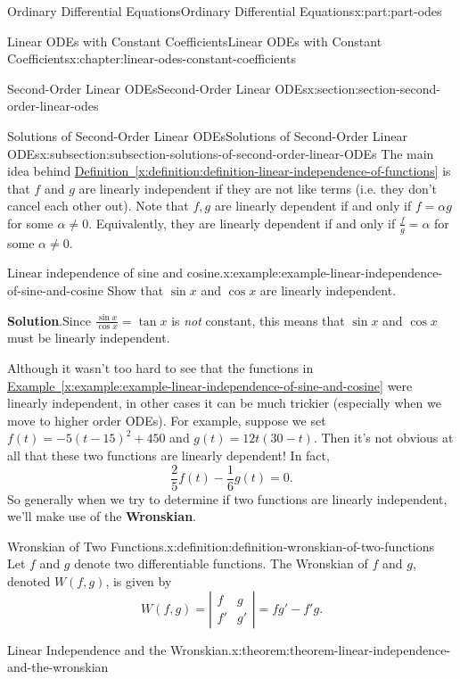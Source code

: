 \documentclass[twoside,10pt,]{book}
\newcommand{\blocktitlefont}{\relax}
\newcommand{\xreffont}{\relax}
\newcommand{\terminology}[1]{\textbf{#1}}
\numberwithin{equation}{part}
\newcommand{\amp}{&}
\begin{document}
\begin{partptx}{Ordinary Differential Equations}{}{Ordinary Differential Equations}{}{}{x:part:part-odes}
\begin{chapterptx}{Linear ODEs with Constant Coefficients}{}{Linear ODEs with Constant Coefficients}{}{}{x:chapter:linear-odes-constant-coefficients}
\begin{sectionptx}{Second-Order Linear ODEs}{}{Second-Order Linear ODEs}{}{}{x:section:section-second-order-linear-odes}
\begin{subsectionptx}{Solutions of Second-Order Linear ODEs}{}{Solutions of Second-Order Linear ODEs}{}{}{x:subsection:subsection-solutions-of-second-order-linear-ODEs}
The main idea behind \hyperref[x:definition:definition-linear-independence-of-functions]{Definition~{\xreffont\ref{x:definition:definition-linear-independence-of-functions}}} is that \(f\) and \(g\) are linearly independent if they are not like terms (i.e. they don't cancel each other out). Note that \(f,g\) are linearly dependent if and only if \(f = \alpha g\) for some \(\alpha\neq 0\). Equivalently, they are linearly dependent if and only if \(\frac{f}{g} = \alpha\) for some \(\alpha\neq0\).%
\begin{example}{Linear independence of sine and cosine.}{x:example:example-linear-independence-of-sine-and-cosine}%
Show that \(\sin x\) and \(\cos x\) are linearly independent.%
\par\smallskip%
\noindent\textbf{\blocktitlefont Solution}.\hypertarget{g:solution:idp105548815577376}{}\quad{}Since \(\frac{\sin x}{\cos x} = \tan x\) is \emph{not} constant, this means that \(\sin x\) and \(\cos x\) must be linearly independent.%
\end{example}
Although it wasn't too hard to see that the functions in \hyperref[x:example:example-linear-independence-of-sine-and-cosine]{Example~{\xreffont\ref{x:example:example-linear-independence-of-sine-and-cosine}}} were linearly independent, in other cases it can be much trickier (especially when we move to higher order ODEs). For example, suppose we set \(f(t) = -5(t-15)^{2} + 450\) and \(g(t) = 12t(30-t)\). Then it's not obvious at all that these two functions are linearly dependent! In fact,%
\begin{equation*}
\frac{2}{5}f(t) - \frac{1}{6}g(t) = 0.
\end{equation*}
So generally when we try to determine if two functions are linearly independent, we'll make use of the \terminology{Wronskian}.%
\begin{definition}{Wronskian of Two Functions.}{x:definition:definition-wronskian-of-two-functions}%
%
Let \(f\) and \(g\) denote two differentiable functions. The Wronskian of \(f\) and \(g\), denoted \(W(f,g)\), is given by%
\begin{equation*}
W(f,g) = \left|\begin{matrix} f \amp g \\ f' \amp g' \end{matrix}\right| = fg' - f'g.
\end{equation*}
%
\end{definition}
\begin{theorem}{Linear Independence and the Wronskian.}{}{x:theorem:theorem-linear-independence-and-the-wronskian}%

\end{theorem}
\end{subsectionptx}
\end{sectionptx}
\end{chapterptx}
\end{partptx}
\end{document}
